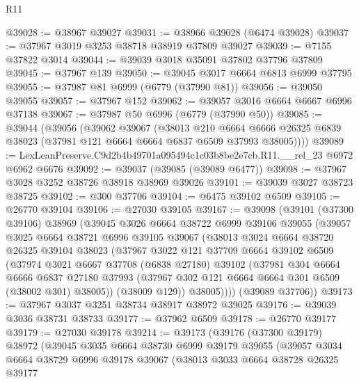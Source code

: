 \begin{lexlean}{R11}
\begin{coremodule}
@39028 := @38967 @39027
@39031 := @38966 @39028 (@6474 @39028)
@39037 := @37967 @3019 @3253 @38718 @38919 @37809 @39027
@39039 := @7155 @37822 @3014
@39044 := @39039 @3018 @35091 @37802 @37796 @37809
@39045 := @37967 @139
@39050 := @39045 @3017 @6664 @6813 @6999 @37795
@39055 := @37987 @81 @6999 (@6779 (@37990 @81))
@39056 := @39050 @39055
@39057 := @37967 @152
@39062 := @39057 @3016 @6664 @6667 @6996 @37138
@39067 := @37987 @50 @6996 (@6779 (@37990 @50))
@39085 := @39044
    (@39056
      (@39062
        @39067
        (@38013
          @210
          @6664
          @6666
          @26325
          @6839
          @38023
          (@37981 @121 @6664 @6664 @6837 @6509 @37993 @38005))))
@39089 := LexLeanPreserve.C9d2b4b49701a095494c1c03b8be2e7cb.R11.__rel_23 @6972 @6962 @6676
@39092 := @39037 (@39085 (@39089 @6477))
@39098 := @37967 @3028 @3252 @38726 @38918 @38969 @39026
@39101 := @39039 @3027 @38723 @38725
@39102 := @300 @37706
@39104 := @6475 @39102 @6509
@39105 := @26770 @39104
@39106 := @27030 @39105
@39167 := @39098
    (@39101
      (@37300 @39106)
      @38969
      (@39045
        @3026
        @6664
        @38722
        @6999
        @39106
        @39055
        (@39057
          @3025
          @6664
          @38721
          @6996
          @39105
          @39067
          (@38013
            @3024
            @6664
            @38720
            @26325
            @39104
            @38023
            (@37967
              @3022
              @121
              @37709
              @6664
              @39102
              @6509
              (@37974
                @3021
                @6667
                @37708
                (@6838 @27180)
                @39102
                (@37981
                  @304
                  @6664
                  @6666
                  @6837
                  @27180
                  @37993
                  (@37967 @302 @121 @6664 @6664 @301 @6509 (@38002 @301) @38005))
                (@38009 @129))
              @38005))))
      (@39089 @37706))
@39173 := @37967 @3037 @3251 @38734 @38917 @38972 @39025
@39176 := @39039 @3036 @38731 @38733
@39177 := @37962 @6509
@39178 := @26770 @39177
@39179 := @27030 @39178
@39214 := @39173
    (@39176
      (@37300 @39179)
      @38972
      (@39045
        @3035
        @6664
        @38730
        @6999
        @39179
        @39055
        (@39057
          @3034
          @6664
          @38729
          @6996
          @39178
          @39067
          (@38013
            @3033
            @6664
            @38728
            @26325
            @39177

\end{coremodule}
\end{lexlean}

